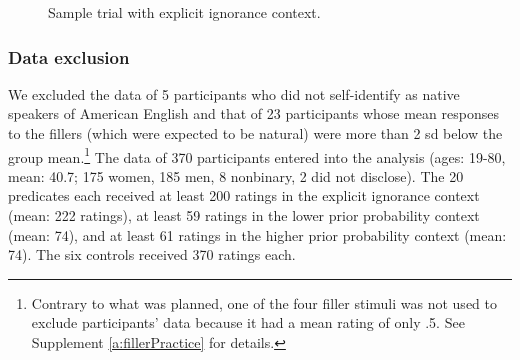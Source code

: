 \documentclass[11pt,fleqn]{article}
\newcommand{\6}{\mbox{$[\hspace*{-.6mm}[$}}
\newcommand{\9}{\mbox{$]\hspace*{-.6mm}]$}}
\begin{document}
\begin{figure}[h]
\centering
\caption{Sample trial with explicit ignorance context.}\label{f:trials}
\end{figure}


\subsubsection{Data exclusion} 

We excluded the data of 5 participants who did not self-identify as native speakers of American English and that of 23 participants whose mean responses to the fillers (which were expected to be natural) were more than 2 sd below the group mean.\footnote{Contrary to what was planned, one of the four filler stimuli was not used to exclude participants' data because it had a mean rating of only .5. See Supplement \ref{a:fillerPractice} for details.} The data of 370 participants entered into the analysis (ages: 19-80, mean: 40.7; 175 women, 185 men, 8 nonbinary, 2 did not disclose). The 20 predicates each received at least 200 ratings in the explicit ignorance context (mean: 222 ratings), at least 59 ratings in the lower prior probability context (mean: 74), and at least 61 ratings in the higher prior probability context (mean: 74). The six controls received 370 ratings each. 
\end{document}
